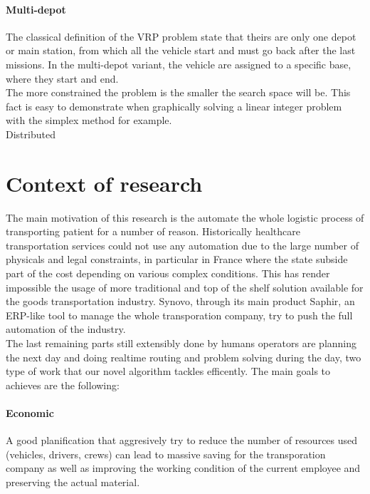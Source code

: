 \documentclass[12pt]{memoir}
\begin{document}
\paragraph{Multi-depot} %
\label{par:Multi-depot}
The classical definition of the VRP problem state that theirs are only one depot or
main station, from which all the vehicle start and must go back after the last
missions. In the multi-depot variant, the vehicle are assigned to a specific base,
where they start and end.\\

The more constrained the problem is the smaller the search space will be. This fact
is easy to demonstrate when graphically solving a linear integer problem with the
simplex method for example.\\


Distributed 

\section{Context of research}
\label{sec:Context of research}
The main motivation of this research is the automate the whole logistic process of
transporting patient for a number of reason. Historically healthcare transportation
services could not use any automation due to the large number of physicals and legal
constraints, in particular in France where the state subside part of the cost
depending on various complex conditions. This has render impossible the usage of
more traditional and top of the shelf solution available for the goods
transportation industry. Synovo, through its main product Saphir, an ERP-like tool
to manage the whole transporation company, try to push the full automation of the
industry. \\
The last remaining parts still extensibly done by humans operators are planning the
next day and doing realtime routing and problem solving during the day, two type of
work that our novel algorithm tackles efficently. The main goals to achieves are the
following:
\paragraph{Economic} %
\label{par:Economic}
A good planification that aggresively try to reduce the number of resources used
(vehicles, drivers, crews) can lead to massive saving for the transporation company
as well as improving the working condition of the current employee and preserving
the actual material.
\end{document}

